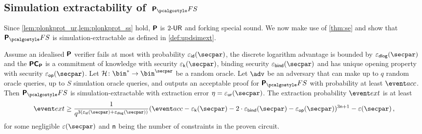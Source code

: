 
\subsection{Simulation extractability of~$\plonkprotfs$}
Since \cref{lem:plonkprot_ur,lem:plonkprot_ss} hold, $\bm{\mathsf{P}}$ is ${2\text{-}\mathsf{UR}}$ and
forking special sound. We now make use of \cref{thm:se} and show that
$\plonkprot_\fs$ is simulation-extractable as defined in \cref{def:updsimext}.

\begin{corollary}
\label{thm:plonkprotfs_se}
Assume an idealised $\bm{\mathsf{P}}$ verifier fails at most with probability
$\epsid(\secpar)$, the discrete logarithm advantage is bounded by $\epsdlog(\secpar)$
and the $\bm{\mathsf{PC}}_{\bm{\mathsf{P}}}$ is a commitment of knowledge with security $\epsk(\secpar)$, binding
security $\epsbind(\secpar)$ and has unique opening property with security
$\epsop(\secpar)$. Let $\ro\colon \bin^* \to \bin^\secpar$ be a random oracle. Let
$\advse$ be an adversary that can make up to $q$ random oracle queries, up to $S$
simulation oracle queries, and outputs an acceptable proof for $\plonkprotfs$ with
probability at least $\accProb$. Then $\plonkprotfs$ is simulation-extractable with extraction error $\eta = \epsur(\secpar)$. The
extraction probability $\extProb$ is at least
\[
	\extProb \geq \frac{1}{q^{3 (\epsid(\secpar)+\epsdlog(\secpar))}} (\accProb - \epsk(\secpar) - 2\cdot\epsbind(\secpar) -
  \epsop(\secpar))^{3\noofc + 1} -\eps(\secpar)\,,
\]
for some negligible $\eps(\secpar)$ and $\mathsf{n}$ being the number of
constraints in the proven circuit.
\end{corollary}
 
